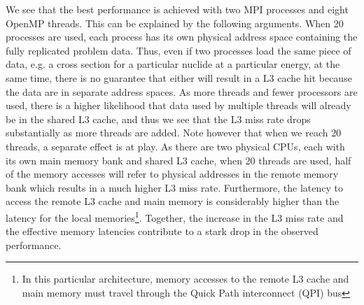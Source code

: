 \documentclass{mc2015}
\begin{document}
We see that the best performance is achieved with two MPI processes and eight
OpenMP threads. This can be explained by the following arguments. When 20
processes are used, each process has its own physical address space containing
the fully replicated problem data. Thus, even if two processes load the same
piece of data, e.g. a cross section for a particular nuclide at a particular
energy, at the same time, there is no guarantee that either will result in a L3
cache hit because the data are in separate address spaces. As more threads and
fewer processors are used, there is a higher likelihood that data used by
multiple threads will already be in the shared L3 cache, and thus we see that
the L3 miss rate drops substantially as more threads are added. Note however
that when we reach 20 threads, a separate effect is at play. As there are two
physical CPUs, each with its own main memory bank and shared L3 cache, when 20
threads are used, half of the memory accesses will refer to physical addresses
in the remote memory bank which results in a much higher L3 miss
rate. Furthermore, the latency to access the remote L3 cache and main memory is
considerably higher than the latency for the local memories\footnote{In this
  particular architecture, memory accesses to the remote L3 cache and main
  memory must travel through the Quick Path interconnect (QPI) bus}. Together,
the increase in the L3 miss rate and the effective memory latencies contribute
to a stark drop in the observed performance.
\end{document}
